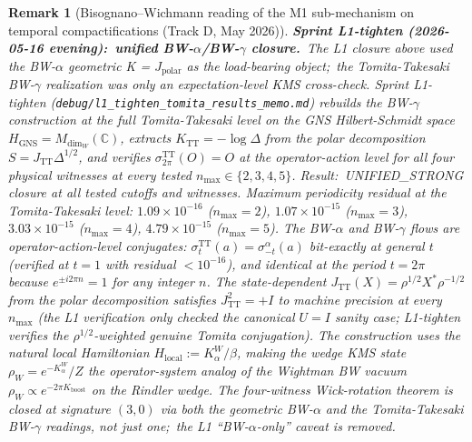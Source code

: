 \documentclass[11pt]{article}
\newtheorem{remark}{Remark}
\begin{document}
\begin{remark}[Bisognano--Wichmann reading of the M1 sub-mechanism on
temporal compactifications (Track D, May 2026)]
\textbf{Sprint L1-tighten (2026-05-16 evening):\ unified BW-$\alpha$/BW-$\gamma$
closure.}\ The L1 closure above used the BW-$\alpha$ geometric K =
$J_{\mathrm{polar}}$ as the load-bearing object;\ the Tomita-Takesaki
BW-$\gamma$ realization was only an expectation-level KMS cross-check.
Sprint L1-tighten
(\texttt{debug/l1\_tighten\_tomita\_results\_memo.md}) rebuilds the
BW-$\gamma$ construction at the full Tomita-Takesaki level on the GNS
Hilbert-Schmidt space $H_{\mathrm{GNS}} = M_{\dim_W}(\mathbb{C})$,
extracts $K_{\mathrm{TT}} = -\log \Delta$ from the polar decomposition
$S = J_{\mathrm{TT}} \Delta^{1/2}$, and verifies
$\sigma_{2\pi}^{\mathrm{TT}}(O) = O$ at the operator-action level for
all four physical witnesses at every tested $n_{\max} \in \{2, 3, 4,
5\}$.  Result:\ \emph{UNIFIED\_STRONG closure} at all tested cutoffs
and witnesses.  Maximum periodicity residual at the Tomita-Takesaki
level: $1.09\times 10^{-16}$ ($n_{\max}=2$), $1.07\times 10^{-15}$
($n_{\max}=3$), $3.03\times 10^{-15}$ ($n_{\max}=4$), $4.79\times
10^{-15}$ ($n_{\max}=5$).  The BW-$\alpha$ and BW-$\gamma$ flows are
operator-action-level conjugates: $\sigma_t^{\mathrm{TT}}(a) =
\sigma_{-t}^{\alpha}(a)$ bit-exactly at general $t$ (verified at $t =
1$ with residual $<10^{-16}$), and identical at the period $t = 2\pi$
because $e^{\pm i 2\pi n} = 1$ for any integer $n$.  The
state-dependent $J_{\mathrm{TT}}(X) = \rho^{1/2} X^* \rho^{-1/2}$ from
the polar decomposition satisfies $J_{\mathrm{TT}}^2 = +I$ to machine
precision at every $n_{\max}$ (the L1 verification only checked the
canonical $U = I$ sanity case; L1-tighten verifies the $\rho^{1/2}$-weighted
genuine Tomita conjugation).  The construction uses the natural local
Hamiltonian $H_{\mathrm{local}} := K_\alpha^W / \beta$, making the
wedge KMS state $\rho_W = e^{-K_\alpha^W}/Z$ the operator-system
analog of the Wightman BW vacuum $\rho_W \propto e^{-2\pi
K_{\mathrm{boost}}}$ on the Rindler wedge.  The four-witness
Wick-rotation theorem is closed at signature $(3, 0)$ via
\emph{both} the geometric BW-$\alpha$ and the Tomita-Takesaki
BW-$\gamma$ readings, not just one;\ the L1 ``BW-$\alpha$-only''
caveat is removed.
\end{remark}
\end{document}
